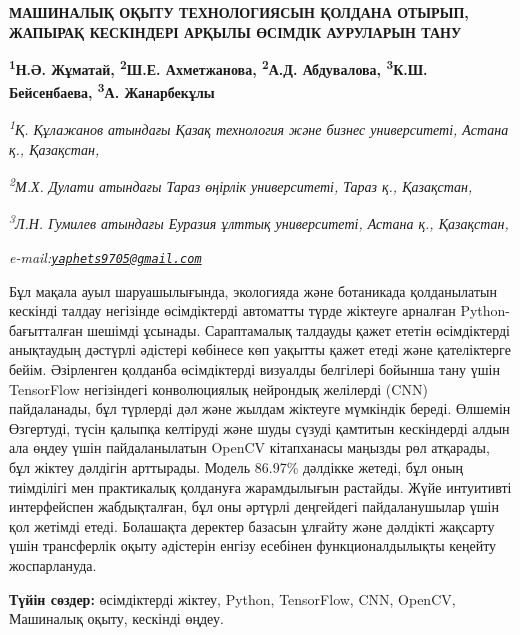 \begin{articleheader}
{\bfseries МАШИНАЛЫҚ ОҚЫТУ ТЕХНОЛОГИЯСЫН ҚОЛДАНА ОТЫРЫП, ЖАПЫРАҚ КЕСКІНДЕРІ АРҚЫЛЫ ӨСІМДІК АУРУЛАРЫН ТАНУ}

{\bfseries
\textsuperscript{1}Н.Ә. Жұматай,
\textsuperscript{2}Ш.Е. Ахметжанова,
\textsuperscript{2}А.Д. Абдувалова,
\textsuperscript{3}К.Ш. Бейсенбаева,
\textsuperscript{3}А. Жанарбекұлы\textsuperscript{\envelope }}
\end{articleheader}

\begin{affiliation}
\emph{\textsuperscript{1}Қ. Құлажанов атындағы Қазақ технология және бизнес университеті, Астана қ., Қазақстан,}

\emph{\textsuperscript{2}М.Х. Дулати атындағы Тараз өңірлік университеті, Тараз қ., Қазақстан,}

\emph{\textsuperscript{3}Л.Н. Гумилев атындағы Еуразия ұлттық университеті, Астана қ., Қазақстан,}

\emph{e-mail:\href{mailto:yaphets9705@gmail.com}{\nolinkurl{yaphets9705@gmail.com}}}
\end{affiliation}

Бұл мақала ауыл шаруашылығында, экологияда және ботаникада қолданылатын
кескінді талдау негізінде өсімдіктерді автоматты түрде жіктеуге арналған
Python-бағытталған шешімді ұсынады. Сараптамалық талдауды қажет ететін
өсімдіктерді анықтаудың дәстүрлі әдістері көбінесе көп уақытты қажет
етеді және қателіктерге бейім. Әзірленген қолданба өсімдіктерді визуалды
белгілері бойынша тану үшін TensorFlow негізіндегі конволюциялық
нейрондық желілерді (CNN) пайдаланады, бұл түрлерді дәл және жылдам
жіктеуге мүмкіндік береді. Өлшемін Өзгертуді, түсін қалыпқа келтіруді
және шуды сүзуді қамтитын кескіндерді алдын ала өңдеу үшін
пайдаланылатын OpenCV кітапханасы маңызды рөл атқарады, бұл жіктеу
дәлдігін арттырады. Модель 86.97\% дәлдікке жетеді, бұл оның тиімділігі
мен практикалық қолдануға жарамдылығын растайды. Жүйе интуитивті
интерфейспен жабдықталған, бұл оны әртүрлі деңгейдегі пайдаланушылар
үшін қол жетімді етеді. Болашақта деректер базасын ұлғайту және дәлдікті
жақсарту үшін трансферлік оқыту әдістерін енгізу есебінен
функционалдылықты кеңейту жоспарлануда.

{\bfseries Түйін сөздер:} өсімдіктерді жіктеу, Python, TensorFlow, CNN,
OpenCV, Машиналық оқыту, кескінді өңдеу.

